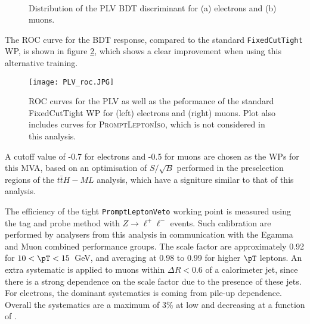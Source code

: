 \begin{figure}[H]
\begin{center}
    \\
    \label{fig:PLV_score}
    \caption{Distribution of the PLV BDT discriminant for (a) electrons and (b) muons.}
\end{center}
\end{figure}

The ROC curve for the BDT response, compared to the standard \verb!FixedCutTight! WP, is shown in figure \ref{fig:PLV_roc}, which shows a clear improvement when using this alternative training.

\begin{figure}[H]
\begin{center}
    \texttt{[image: PLV\_roc.JPG]}
    \label{fig:PLV_roc}
    \caption{ROC curves for the PLV as well as the peformance of the standard FixedCutTight WP for (left) electrons and (right) muons. Plot also includes curves for \textsc{PromptLeptonIso}, which is not considered in this analysis.}
\end{center}
\end{figure}

A cutoff value of -0.7 for electrons and -0.5 for muons are chosen as the WPs for this MVA, based on an optimisation of $S/\sqrt{B}$ performed in the preselection regions of the $t\bar{t}H-ML$ analysis, which have a signiture similar to that of this analysis.

The efficiency of the tight \texttt{PromptLeptonVeto} working point is measured using the tag and probe method with $Z\rightarrow \ell^{+}\ell^{-}$ events. Such calibration are performed by analysers from this analysis in communication with the Egamma and Muon combined performance groups. The scale factor are approximately 0.92 for $10 < \pT < 15$~GeV, and averaging at 0.98 to 0.99 for higher $\pT$ leptons. An extra systematic is applied to muons within $\Delta R < 0.6$ of a calorimeter jet, since there is a strong dependence on the scale factor due to the presence of these jets. For electrons, the dominant systematics  is coming from pile-up dependence. Overall the systematics are a maximum of 3\% at low \pT and decreasing at a function of \pT.
